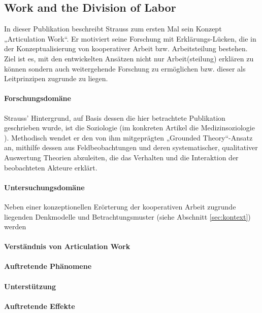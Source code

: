 \subsection{Work and the Division of Labor}

In dieser Publikation \citep{Strauss85} beschreibt Strauss zum ersten Mal sein Konzept „Articulation Work“. Er motiviert seine Forschung mit Erklärungs-Lücken, die in der Konzeptualisierung von kooperativer Arbeit bzw. Arbeitsteilung bestehen. Ziel ist es, mit den entwickelten Ansätzen nicht nur Arbeit(steilung) erklären zu können sondern auch weitergehende Forschung zu ermöglichen bzw. dieser als Leitprinzipen zugrunde zu liegen. 

\paragraph{Forschungsdomäne}
Strauss' Hintergrund, auf Basis dessen die hier betrachtete Publikation geschrieben wurde, ist die Soziologie (im konkreten Artikel die Medizinsoziologie \citep[vgl.][]{Siegrist05}). Methodisch wendet er den von ihm mitgeprägten „Grounded Theory“-Ansatz \citep{Glaser77} an, mithilfe dessen aus Feldbeobachtungen und deren systematischer, qualitativer Auswertung Theorien abzuleiten, die das Verhalten und die Interaktion der beobachteten Akteure erklärt.

\paragraph{Untersuchungsdomäne}
Neben einer konzeptionellen Erörterung der kooperativen Arbeit zugrunde liegenden Denkmodelle und Betrachtungsmuster (siehe Abschnitt \ref{sec:kontext}) werden  

\paragraph{Verständnis von Articulation Work}

\paragraph{Auftretende Phänomene}

\paragraph{Unterstützung}

\paragraph{Auftretende Effekte}

